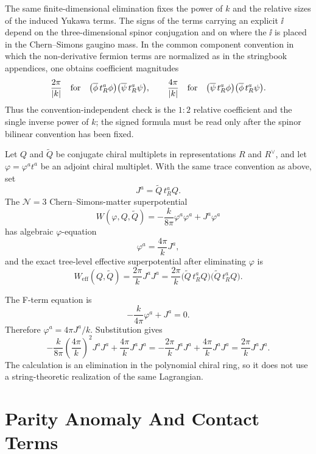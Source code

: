 The same finite-dimensional elimination fixes the power of \(k\) and the
relative sizes of the induced Yukawa terms.  The signs of the terms carrying
an explicit \(\ii\) depend on the three-dimensional spinor conjugation and on
where the \(\ii\) is placed in the Chern--Simons gaugino mass.  In the common
component convention in which the non-derivative fermion terms are normalized
as in the stringbook appendices, one obtains coefficient magnitudes
\[
  \frac{2\pi}{\lvert k\rvert}
  \quad\hbox{for}\quad
  \bigl(\overline\phi\,t_R^a\phi\bigr)
  \bigl(\overline\psi\,t_R^a\psi\bigr),
  \qquad
  \frac{4\pi}{\lvert k\rvert}
  \quad\hbox{for}\quad
  \bigl(\overline\psi\,t_R^a\phi\bigr)
  \bigl(\overline\phi\,t_R^a\psi\bigr).
\]
Thus the convention-independent check is the \(1:2\) relative coefficient and
the single inverse power of \(k\); the signed formula must be read only after
the spinor bilinear convention has been fixed.

\begin{remark}[\(\mathcal N=3\) adjoint-chiral elimination]
\label{rem:three-d-n3-adjoint-chiral-elimination}
Let \(Q\) and \(\widetilde Q\) be conjugate chiral multiplets in
representations \(R\) and \(R^\vee\), and let \(\varphi=\varphi^a t^a\) be
an adjoint chiral multiplet.  With the same trace convention as above, set
\[
  J^a=\widetilde Q\,t_R^a Q .
\]
The \(\mathcal N=3\) Chern--Simons-matter superpotential
\[
  W(\varphi,Q,\widetilde Q)
  =
  -\frac{k}{8\pi}\varphi^a\varphi^a
  +
  J^a\varphi^a
\]
has algebraic \(\varphi\)-equation
\[
  \varphi^a=\frac{4\pi}{k}J^a,
\]
and the exact tree-level effective superpotential after eliminating
\(\varphi\) is
\[
  W_{\mathrm{eff}}(Q,\widetilde Q)
  =
  \frac{2\pi}{k}J^aJ^a
  =
  \frac{2\pi}{k}
  \bigl(\widetilde Q\,t_R^aQ\bigr)
  \bigl(\widetilde Q\,t_R^aQ\bigr).
\]

The F-term equation is
\[
  -\frac{k}{4\pi}\varphi^a+J^a=0.
\]
Therefore \(\varphi^a=4\pi J^a/k\).  Substitution gives
\[
  -\frac{k}{8\pi}
  \left(\frac{4\pi}{k}\right)^2J^aJ^a
  +
  \frac{4\pi}{k}J^aJ^a
  =
  -\frac{2\pi}{k}J^aJ^a
  +
  \frac{4\pi}{k}J^aJ^a
  =
  \frac{2\pi}{k}J^aJ^a .
\]
The calculation is an elimination in the polynomial chiral ring, so it does
not use a string-theoretic realization of the same Lagrangian.
\end{remark}

\section{Parity Anomaly And Contact Terms}

